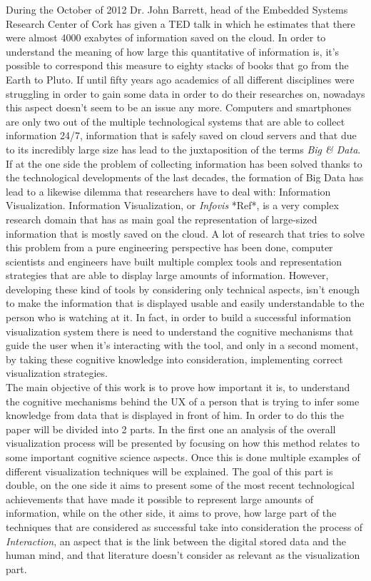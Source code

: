 \documentclass[10p,letterpaper]{article}
\begin{document}
During the October of 2012 Dr. John Barrett, head of the Embedded Systems Research Center of Cork has given a TED talk in which he estimates that there were almost 4000 exabytes 
of information saved on the cloud. In order to understand the meaning of how large this quantitative of information is, it's possible to correspond this measure to eighty stacks of books that go from the Earth to Pluto. If until fifty years ago academics of all different disciplines were struggling in order to gain some data in order to do their researches on, nowadays this aspect doesn't seem to be an issue any more. Computers and smartphones are only two out of the multiple technological systems that are able to collect information 24/7, information that is safely saved on cloud servers and that due to its incredibly large size has lead to the juxtaposition of the terms \textit{Big \& Data}.\\
If at the one side the problem of collecting information has been solved thanks to the technological developments of the last decades, the formation of Big Data has lead to a likewise dilemma that researchers have to deal with: Information Visualization. Information Visualization, or \textit{Infovis} *Ref*, is a very complex research domain that has as main goal the representation of large-sized information that is mostly saved on the cloud. A lot of research that tries to solve this problem from a pure engineering perspective has been done, computer scientists and engineers have built multiple complex tools and representation strategies that are able to display large amounts of information. However, developing these kind of tools by considering only technical aspects, isn't enough to make the information that is displayed usable and easily understandable to the person who is watching at it. In fact, in order to build a successful information visualization system there is need to understand the cognitive mechanisms that guide the user when it's interacting with the tool, and only in a second moment, by taking these cognitive knowledge into consideration, implementing correct visualization strategies.\\
The main objective of this work is to prove how important it is, to understand the cognitive mechanisms behind the UX of a person that is trying to infer some knowledge from data that is displayed in front of him. In order to do this the paper will be divided into 2 parts. In the first one an analysis of the overall visualization process will be presented by focusing on how this method relates to some important cognitive science aspects. Once this is done multiple examples of different visualization techniques will be explained. The goal of this part is double, on the one side it aims to present some of the most recent technological achievements that have made it possible to represent large amounts of information, while on the other side, it aims to prove, how large part of the techniques that are considered as successful take into consideration the process of \textit{Interaction}, an aspect that is the link between the digital stored data and the human mind, and that literature doesn't consider as relevant as the visualization part.
\end{document}
